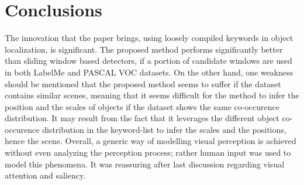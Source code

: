 \documentclass[11pt]{article}
\begin{document}
\section{Conclusions}
The innovation that the paper brings, using loosely compiled keywords in object localization, is significant.
The proposed method performs significantly better than sliding window based detectors, if a portion of candidate windows are used in both LabelMe and PASCAL VOC datasets.
On the other hand, one weakness should be mentioned that the proposed method seems to suffer if the dataset contains similar scenes, meaning that it seems difficult for the method to infer the position and the scales of objects if the dataset shows the same co-occurence distribution.
It may result from the fact that it leverages the different object co-occurence distribution in the keyword-list to infer the scales and the positions, hence the scene.
Overall, a generic way of modelling visual perception is achieved without even analyzing the perception process; rather human input was used to model this phenomena.
It was reassuring after last discussion regarding visual attention and saliency.

% 
% 
\end{document}
